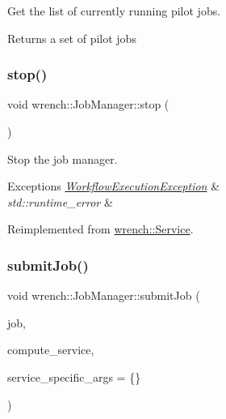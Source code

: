 Get the list of currently running pilot jobs. 

\begin{DoxyReturn}{Returns}
a set of pilot jobs 
\end{DoxyReturn}
\mbox{\label{classwrench_1_1_job_manager_af9c85f6a54e26f115fa09ef1c9327aa7}} 
\subsubsection{\texorpdfstring{stop()}{stop()}}
{\footnotesize\ttfamily void wrench\+::\+Job\+Manager\+::stop (\begin{DoxyParamCaption}{ }\end{DoxyParamCaption})\hspace{0.3cm}{\ttfamily [virtual]}}



Stop the job manager. 


\begin{DoxyExceptions}{Exceptions}
{\em \hyperlink{classwrench_1_1_workflow_execution_exception}{Workflow\+Execution\+Exception}} & \\
\hline
{\em std\+::runtime\+\_\+error} & \\
\hline
\end{DoxyExceptions}


Reimplemented from \hyperlink{classwrench_1_1_service_ac33a32f4758c6f51b27d2cfb9b46efda}{wrench\+::\+Service}.

\mbox{\label{classwrench_1_1_job_manager_a69de09b0d5ae34cbcf9208be88901728}} 
\subsubsection{\texorpdfstring{submit\+Job()}{submitJob()}}
{\footnotesize\ttfamily void wrench\+::\+Job\+Manager\+::submit\+Job (\begin{DoxyParamCaption}\item[{\hyperlink{classwrench_1_1_workflow_job}{Workflow\+Job} $\ast$}]{job,  }\item[{\hyperlink{classwrench_1_1_compute_service}{Compute\+Service} $\ast$}]{compute\+\_\+service,  }\item[{std\+::map$<$ std\+::string, std\+::string $>$}]{service\+\_\+specific\+\_\+args = {\ttfamily \{\}} }\end{DoxyParamCaption})}



